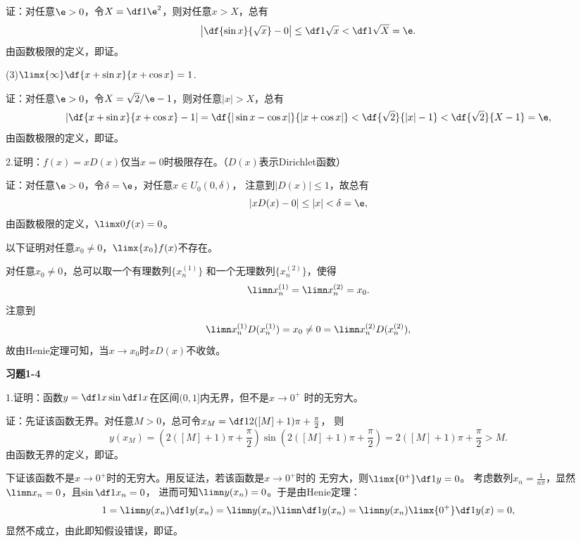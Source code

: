 证：对任意$\e>0$，令$X=\df1{\e^2}$，则对任意$x>X$，总有
$$\left|\df{\sin x}{\sqrt x}-0\right|\leq\df1{\sqrt x}
<\df1{\sqrt X}=\e.$$
由函数极限的定义，即证。\fin

\bs
(3)$\limx{\infty}\df{x+\sin x}{x+\cos x}=1$.

证：对任意$\e>0$，令$X=\sqrt2/\e-1$，则对任意$|x|>X$，总有
$$\left|\df{x+\sin x}{x+\cos x}-1\right|
=\df{|\sin x-\cos x|}{|x+\cos x|}
<\df{\sqrt2}{|x|-1}<\df{\sqrt2}{X-1}=\e,$$
由函数极限的定义，即证。\fin

\bs
2.证明：$f(x)=xD(x)$仅当$x=0$时极限存在。（$D(x)$表示Dirichlet函数）

证：对任意$\e>0$，令$\delta=\e$，对任意$x\in U_0(0,\delta)$，
注意到$|D(x)|\leq 1$，故总有
$$|xD(x)-0|\leq |x|<\delta=\e,$$
由函数极限的定义，$\limx0f(x)=0$。

以下证明对任意$x_0\ne 0$，$\limx{x_0}f(x)$不存在。

对任意$x_0\ne0$，总可以取一个有理数列$\{x_n^{(1)}\}$
和一个无理数列$\{x_n^{(2)}\}$，使得
$$\limn x_n^{(1)}=\limn x_n^{(2)}=x_0.$$
注意到
$$\limn x_n^{(1)}D(x_n^{(1)})=x_0
\ne 0=\limn x_n^{(2)}D(x_n^{(2)}),$$
故由Henie定理可知，当$x\to x_0$时$xD(x)$不收敛。\fin





\bigskip

\begin{center}
	\bf 习题1-4
\end{center}

1.证明：函数$y=\df1x\sin\df1x$在区间$(0,1]$内无界，但不是$x\to0^+$
时的无穷大。

证：先证该函数无界。对任意$M>0$，总可令$x_M=\df1{2([M]+1)\pi+\frac{\pi}2}$，
则
$$y(x_M)=\left(2([M]+1)\pi+\frac{\pi}2\right)\sin(2([M]+1)\pi+\frac{\pi}2)
=2([M]+1)\pi+\frac{\pi}2>M.$$
由函数无界的定义，即证。

下证该函数不是$x\to0^+$时的无穷大。用反证法，若该函数是$x\to0^+$时的
无穷大，则$\limx{0^+}\df1y=0$。
考虑数列$x_n=\frac1{n\pi}$，显然$\limn x_n=0$，且$\sin\df1{x_n}=0$，
进而可知$\limn y(x_n)=0$。于是由Henie定理：
$$1=\limn y(x_n)\df1{y(x_n)}
=\limn y(x_n)\limn\df1{y(x_n)}=\limn y(x_n)\limx{0^+}\df1{y(x)}=0,$$
显然不成立，由此即知假设错误，即证。\fin

